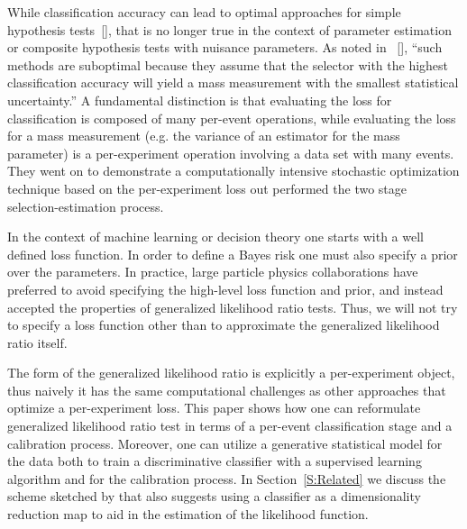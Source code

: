 \documentclass[aoas,preprint]{imsart}
\newcommand{\citek}[1]{[\cite{#1}]}
\numberwithin{equation}{section}
\theoremstyle{plain}
\begin{document}
While classification accuracy can lead to optimal approaches for simple hypothesis tests~\citek{Dempster1965}, that is no longer true in the context of parameter estimation or composite hypothesis tests with nuisance parameters. As noted in ~\citek{Whiteson:2006ws}, ``such methods are suboptimal because they assume that the selector with the highest classification accuracy will yield a mass measurement with the smallest statistical uncertainty.''
A fundamental distinction is that evaluating the loss for classification is composed of many per-event operations, while evaluating the loss for a mass measurement (e.g. the variance of an estimator for the mass parameter) is a per-experiment operation involving a data set with many events. They went on to demonstrate a computationally intensive stochastic optimization technique based on the per-experiment loss out performed the two stage selection-estimation process. 

In the context of machine learning or decision theory one starts with a well defined loss function.
In order to define a Bayes risk one must also specify a prior over the parameters.
In practice, large particle physics collaborations have preferred to avoid specifying the 
high-level loss function and prior, and instead accepted the properties of generalized likelihood ratio tests.
Thus, we will not try to specify a loss function other than to approximate the generalized likelihood ratio itself.

The form of the generalized likelihood ratio is explicitly a per-experiment object, thus naively it has the same computational challenges as other approaches that optimize a per-experiment loss. 
This paper shows how one can reformulate generalized likelihood ratio test in terms of a per-event classification stage and a calibration process. Moreover, one can utilize a generative statistical model for the data both to train a discriminative classifier with a supervised learning algorithm and for the calibration process.
In Section~\ref{S:Related} we discuss the scheme sketched by \cite{Neal:2007zz} that also suggests using a classifier  as a dimensionality reduction map to aid in the estimation of the likelihood function.
\end{document}
